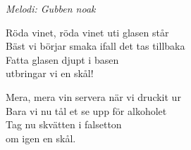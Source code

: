 {\footnotesize\textit{Melodi: Gubben noak}}\par
\vspace{10pt}
Röda vinet, röda vinet uti glasen står\\
Bäst vi börjar smaka ifall det tas tillbaka\\
Fatta glasen djupt i basen\\
utbringar vi en skål!\par
\vspace{10pt}
Mera, mera vin servera när vi druckit ur\\
Bara vi nu tål et se upp för alkoholet\\
Tag nu skvätten i falsetton\\
om igen en skål.
